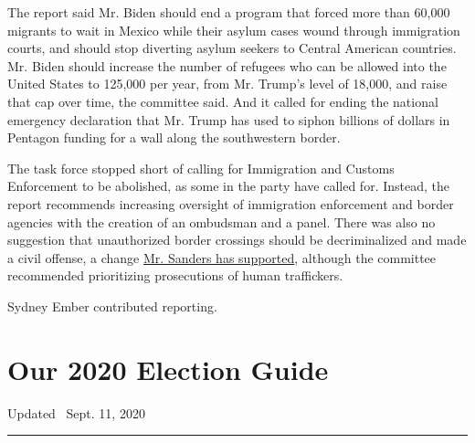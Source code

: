 The report said Mr. Biden should end a program that forced more than
60,000 migrants to wait in Mexico while their asylum cases wound through
immigration courts, and should stop diverting asylum seekers to Central
American countries. Mr. Biden should increase the number of refugees who
can be allowed into the United States to 125,000 per year, from Mr.
Trump's level of 18,000, and raise that cap over time, the committee
said. And it called for ending the national emergency declaration that
Mr. Trump has used to siphon billions of dollars in Pentagon funding for
a wall along the southwestern border.

The task force stopped short of calling for Immigration and Customs
Enforcement to be abolished, as some in the party have called for.
Instead, the report recommends increasing oversight of immigration
enforcement and border agencies with the creation of an ombudsman and a
panel. There was also no suggestion that unauthorized border crossings
should be decriminalized and made a civil offense, a change
\href{https://www.nytimes3xbfgragh.onion/2019/11/07/us/politics/bernie-sanders-immigration.html}{Mr.
Sanders has supported}, although the committee recommended prioritizing
prosecutions of human traffickers.

Sydney Ember contributed reporting.

\hypertarget{our-2020-election-guide}{%
\section{Our 2020 Election Guide}\label{our-2020-election-guide}}

Updated ~Sept. 11, 2020

\begin{center}\rule{0.5\linewidth}{\linethickness}\end{center}

